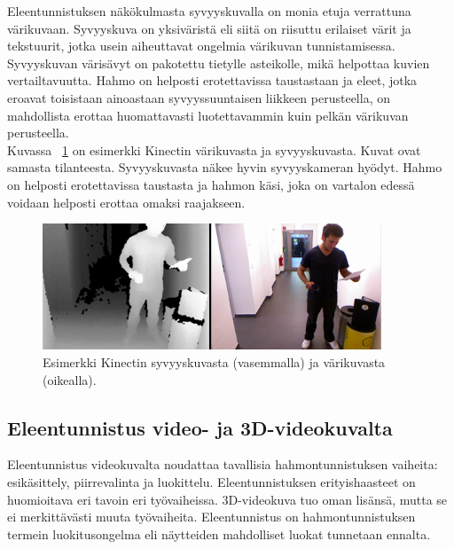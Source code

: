Eleentunnistuksen näkökulmasta syvyyskuvalla on monia etuja verrattuna värikuvaan. Syvyyskuva on yksiväristä
eli siitä on riisuttu erilaiset värit ja tekstuurit, jotka usein aiheuttavat ongelmia värikuvan tunnistamisessa.
Syvyyskuvan värisävyt on pakotettu tietylle asteikolle, mikä helpottaa kuvien vertailtavuutta. Hahmo on helposti erotettavissa
taustastaan ja eleet, jotka eroavat toisistaan ainoastaan syvyyssuuntaisen liikkeen perusteella, 
on mahdollista erottaa huomattavasti luotettavammin kuin pelkän värikuvan perusteella. \citep{5995316} \\
 
Kuvassa ~\ref{fig:kinectkuva} on esimerkki Kinectin värikuvasta ja syvyyskuvasta. Kuvat ovat samasta tilanteesta.
Syvyyskuvasta näkee hyvin syvyyskameran hyödyt. Hahmo on helposti erotettavissa taustasta ja hahmon käsi, 
joka on vartalon edessä voidaan helposti erottaa omaksi raajakseen. \\

\begin{figure}[htb]
  \begin{center}
    \includegraphics[width=0.9\textwidth]{kinect1_cropped-1024x382.png}
    \caption{Esimerkki Kinectin syvyyskuvasta (vasemmalla) ja värikuvasta (oikealla). \citep {kinectkuva}}
    \label{fig:kinectkuva}
  \end{center}
\end{figure}

\subsection{Eleentunnistus video- ja 3D-videokuvalta}

Eleentunnistus videokuvalta noudattaa tavallisia hahmontunnistuksen vaiheita: esikäsittely, piirrevalinta ja
luokittelu. Eleentunnistuksen erityishaasteet on huomioitava eri tavoin eri työvaiheissa. 3D-videokuva tuo 
oman lisänsä, mutta se ei merkittävästi muuta työvaiheita. \citep{6239178} Eleentunnistus on hahmontunnistuksen termein
luokitusongelma eli näytteiden mahdolliset luokat tunnetaan ennalta. \citep{patternreg} \\


